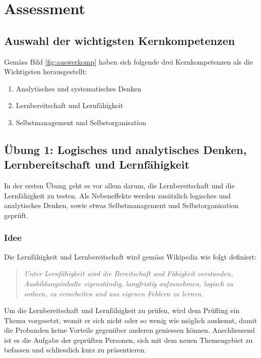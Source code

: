 \chapter{Assessment}

\section{Auswahl der wichtigsten Kernkompetenzen}

Gemäss Bild \ref{fig:auswerkomp} haben sich folgende drei Kernkompetenzen als die Wichtigsten herausgestellt:

\begin{enumerate} 
\item{Analytisches und systematisches Denken}
\item{Lernbereitschaft und Lernfähigkeit}
\item{Selbstmanagement und Selbstorganisation}
\end{enumerate}

\section{Übung 1: Logisches und analytisches Denken, Lernbereitschaft und Lernfähigkeit}

In der ersten Übung geht es vor allem darum, die Lernbereitschaft und die Lernfähigkeit zu testen. Als Nebeneffekte werden zusätzlich logisches und analytisches Denken, sowie etwas Selbstmanagement und Selbstorganisation geprüft.

\subsection{Idee}

Die Lernfähigkeit und Lernbereitschaft wird gemäss Wikipedia \cite{wiki:Lernfahigkeit} wie folgt definiert:
\begin{quote} 
\textit{Unter Lernfähigkeit wird die Bereitschaft und Fähigkeit verstanden, Ausbildungsinhalte eigenständig, langfristig aufzunehmen, logisch zu ordnen, zu verarbeiten und aus eigenen Fehlern zu lernen.}
\end{quote}

Um die Lernbereitschaft und Lernfähigkeit zu prüfen, wird dem Prüfling ein Thema vorgesetzt, womit er sich nicht oder so wenig wie möglich auskennt, damit die Probanden keine Vorteile gegenüber anderen geniessen können. Anschliessend ist es die Aufgabe der geprüften Personen, sich mit dem neuen Themengebiet zu befassen und schliesslich kurz zu präsentieren.

